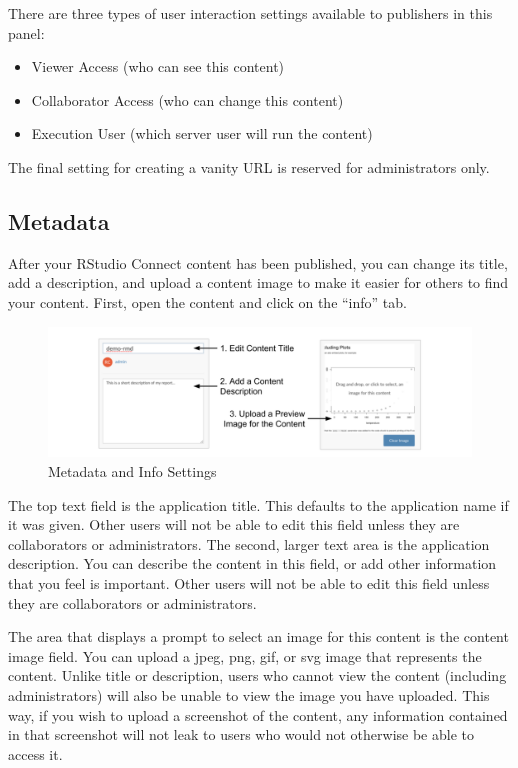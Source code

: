 \documentclass[]{book}
\providecommand{\tightlist}{%
  \setlength{\itemsep}{0pt}\setlength{\parskip}{0pt}}
\theoremstyle{definition}
\theoremstyle{definition}
\theoremstyle{definition}
\theoremstyle{remark}
\begin{document}
There are three types of user interaction settings available to
publishers in this panel:

\begin{itemize}
\tightlist
\item
  Viewer Access (who can see this content)
\item
  Collaborator Access (who can change this content)
\item
  Execution User (which server user will run the content)
\end{itemize}

The final setting for creating a vanity URL is reserved for
administrators only.

\hypertarget{metadata}{%
\subsection{Metadata}\label{metadata}}

After your RStudio Connect content has been published, you can change
its title, add a description, and upload a content image to make it
easier for others to find your content. First, open the content and
click on the ``info'' tab.

\begin{figure}
\centering
\includegraphics{imgs/deployment/info-settings.png}
\caption{Metadata and Info Settings}
\end{figure}

The top text field is the application title. This defaults to the
application name if it was given. Other users will not be able to edit
this field unless they are collaborators or administrators. The second,
larger text area is the application description. You can describe the
content in this field, or add other information that you feel is
important. Other users will not be able to edit this field unless they
are collaborators or administrators.

The area that displays a prompt to select an image for this content is
the content image field. You can upload a jpeg, png, gif, or svg image
that represents the content. Unlike title or description, users who
cannot view the content (including administrators) will also be unable
to view the image you have uploaded. This way, if you wish to upload a
screenshot of the content, any information contained in that screenshot
will not leak to users who would not otherwise be able to access it.
\end{document}
